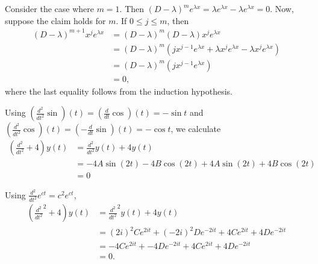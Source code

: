 \documentclass{homework}
\begin{document}

\enlargethispage{2em}
\begin{solution}
  Consider the case where $m=1$. Then $(D - \lambda)^m e^{\lambda x} = \lambda e^{\lambda x} - \lambda e^{\lambda x} = 0$.  Now, suppose the claim holds for $m$. If $0\le j \le m$, then
  \begin{align*}
    (D-\lambda)^{m+1} x^je^{\lambda x} 
    &= (D - \lambda)^m(D - \lambda) x^j e^{\lambda x}\\
    &= (D - \lambda)^m(j x^{j-1} e^{\lambda x} +\lambda x^je^{\lambda x} - \lambda x^je^{\lambda x})\\
    &= (D - \lambda)^m(j x^{j-1} e^{\lambda x})\\
    &= 0, 
  \end{align*}
  where the last equality follows from the induction hypothesis.
\end{solution}

\newpage
{}


Using $(\frac{d^2}{dt^2}\sin)(t) = (\frac d{dt}\cos)(t) = -\sin t$ and $(\frac{d^2}{dt^2}\cos)(t) = (-\frac d{dt}\sin)(t) = -\cos t$, we calculate 
\begin{align*}
  \left(\frac{d^2}{dt^2} + 4\right)y(t) 
  &= \frac{d^2}{dt^2}y(t) + 4y(t)\\
  &= -4A\sin(2t) - 4B\cos(2t) + 4A\sin(2t) + 4B\cos(2t) \\
  &=0
\end{align*}


Using $\frac{d^2}{dt^2} e^{ct} = c^2e^{ct}$,
\begin{align*}
  \left(\frac {d^2}{dt^2}^2 + 4\right)y(t) 
  &= \frac {d^2}{dt^2}^2 y(t) + 4y(t)\\
  &= (2i)^2 C e^{2it} + (-2i)^2 De^{-2it} + 4C e^{2it} + 4De^{-2it} \\
  &= -4C e^{2it} + -4De^{-2it} + 4C e^{2it} + 4De^{-2it} \\
  &=0.
\end{align*}
\end{document}
